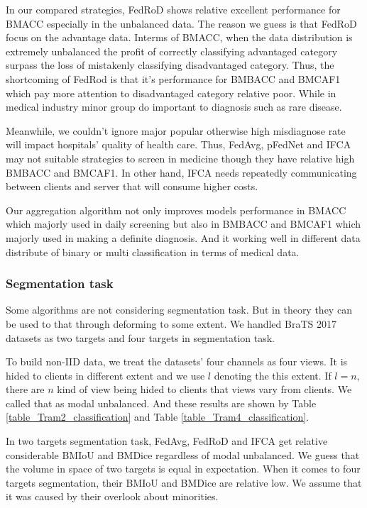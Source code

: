 \documentclass[journal]{IEEEtran}
\begin{document}
In our compared strategies, FedRoD shows relative excellent performance for BMACC especially in the unbalanced data. The reason we guess is that FedRoD focus on the advantage data. Interms of BMACC, when the data distribution is extremely unbalanced the profit of correctly classifying advantaged category surpass the loss of mistakenly classifying disadvantaged category. Thus, the shortcoming of FedRod is that it's performance for BMBACC and BMCAF1 which pay more attention to disadvantaged category relative poor. While in medical industry minor group do important to diagnosis such as rare disease. 

Meanwhile, we couldn't ignore major popular otherwise high misdiagnose rate will impact hospitals' quality of health care. Thus, FedAvg, pFedNet and IFCA may not suitable strategies to screen in medicine though they have relative high BMBACC and BMCAF1. In other hand, IFCA needs repeatedly communicating between clients and server that will consume higher costs.

Our aggregation algorithm not only improves models performance in BMACC which majorly used in daily screening but also in BMBACC and BMCAF1 which majorly used in making a definite diagnosis. And it working well in different data distribute of binary or multi classification in terms of medical data.

\subsubsection{Segmentation task}
Some algorithms are not considering segmentation task. But in theory they can be used to that through deforming to some extent. We handled BraTS 2017 datasets as two targets and four targets in segmentation task. 

To build non-IID data, we treat the datasets' four channels as four views. It is hided to clients in different extent and we use $l$ denoting the this extent. If $l=n$, there are $n$ kind of view being hided to clients that views vary from clients. We called that as modal unbalanced. And these results are shown by Table \ref{table_Tram2_classification} and Table \ref{table_Tram4_classification}.

In two targets segmentation task, FedAvg, FedRoD and IFCA get relative considerable BMIoU and BMDice regardless of modal unbalanced. We guess that the volume in space of two targets is equal in expectation. When it comes to four targets segmentation, their BMIoU and BMDice are relative low. We assume that it was caused by their overlook about minorities. 
\end{document}

